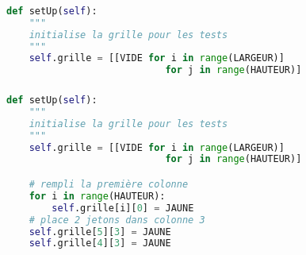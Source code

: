 \documentclass[svgnames,11pt]{beamer}
\begin{document}
\begin{frame}[fragile]
    \frametitle{}

    \begin{center}
        \begin{lstlisting}[language=Python , basicstyle=\ttfamily\small, xleftmargin=.5em, xrightmargin=-1em]
def setUp(self):
    """
    initialise la grille pour les tests
    """
    self.grille = [[VIDE for i in range(LARGEUR)] 
                            for j in range(HAUTEUR)]
\end{lstlisting}
        \label{CODE}
    \end{center}   

\end{frame}
\begin{frame}[fragile]
    \frametitle{}
    \begin{center}
    \end{center}
        \begin{lstlisting}[language=Python , basicstyle=\ttfamily\small, xleftmargin=.5em, xrightmargin=-1em]
def setUp(self):
    """
    initialise la grille pour les tests
    """
    self.grille = [[VIDE for i in range(LARGEUR)] 
                            for j in range(HAUTEUR)]

    # rempli la première colonne
    for i in range(HAUTEUR):
        self.grille[i][0] = JAUNE
    # place 2 jetons dans colonne 3
    self.grille[5][3] = JAUNE
    self.grille[4][3] = JAUNE
\end{lstlisting}


\end{frame}
\end{document}

